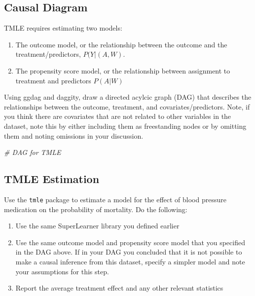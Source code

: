 \documentclass[
]{article}
\newenvironment{Shaded}{\begin{snugshade}}{\end{snugshade}}
\newcommand{\CommentTok}[1]{\textcolor[rgb]{0.56,0.35,0.01}{\textit{#1}}}
\begin{document}
\hypertarget{causal-diagram}{%
\subsection{Causal Diagram}\label{causal-diagram}}

TMLE requires estimating two models:

\begin{enumerate}
    \item The outcome model, or the relationship between the outcome and the treatment/predictors, $P(Y|(A,W)$.
    \item The propensity score model, or the relationship between assignment to treatment and predictors $P(A|W)$
\end{enumerate}

Using ggdag and daggity, draw a directed acylcic graph (DAG) that
describes the relationships between the outcome, treatment, and
covariates/predictors. Note, if you think there are covariates that are
not related to other variables in the dataset, note this by either
including them as freestanding nodes or by omitting them and noting
omissions in your discussion.

\begin{Shaded}
\begin{Highlighting}[]
\CommentTok{\# DAG for TMLE}
\end{Highlighting}
\end{Shaded}

\hypertarget{tmle-estimation}{%
\subsection{TMLE Estimation}\label{tmle-estimation}}

Use the \texttt{tmle} package to estimate a model for the effect of
blood pressure medication on the probability of mortality. Do the
following:

\begin{enumerate}
    \item Use the same SuperLearner library you defined earlier
    \item Use the same outcome model and propensity score model that you specified in the DAG above. If in your DAG you concluded that it is not possible to make a causal inference from this dataset, specify a simpler model and note your assumptions for this step.
    \item Report the average treatment effect and any other relevant statistics
\end{enumerate}
\end{document}
